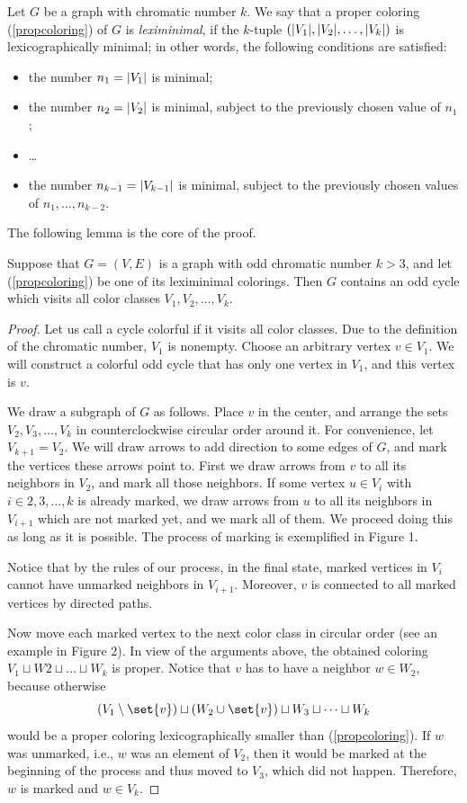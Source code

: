 \begin{problem}
Let $G$ be a graph with chromatic number $k$. We say that a proper coloring (\ref{propcoloring}) of $G$ is \textit{leximinimal}, if the $k$-tuple $(\lvert V_1\rvert, \lvert V_2\rvert, \dots , \lvert V_k\rvert)$ is lexicographically minimal; in other words, the following conditions are satisfied: 
\begin{itemize}
\item the number $n_1 = \lvert V_1\rvert$ is minimal; 
\item the number $n_2 = \lvert V_2\rvert$ is
minimal, subject to the previously chosen value of $n_1$; 
\item \dots  
\item the number $n_{k-1}  = \lvert V_{k-1}\rvert$ is minimal,
subject to the previously chosen values of $n_1, \dots , n_{k-2}$.
\end{itemize}
The following lemma is the core of the proof.
\begin{lemma}
\label{leximinlemma} 
Suppose that $G = (V, E)$ is a graph with odd chromatic number $k > 3$, and let (\ref{propcoloring}) be one of its leximinimal colorings. Then $G$ contains an odd cycle which visits all color classes
$V_1, V_2, \dots, V_k$.
\end{lemma}
\begin{proof}
Let us call a cycle colorful if it visits all color classes. Due to the definition of the chromatic number, $V_1$ is nonempty. Choose an arbitrary vertex $v \in V_1$. We will construct a colorful odd cycle that has only one vertex in $V_1$, and this vertex is $v$. 

We draw a subgraph of $G$ as follows. Place $v$ in the center, and arrange the sets $V_2, V_3, \dots , V_k$ in counterclockwise circular order around it. For convenience, let $V_{k+1} = V_2$. We will draw arrows to add direction to some edges of $G$, and mark the vertices these arrows point to. First we draw arrows from $v$ to all its neighbors in $V_2$, and mark all those neighbors. If some vertex $u \in V_i$ with $i \in {2, 3, \dots , k}$ is already marked, we draw arrows from $u$ to all its neighbors in $V_{i+1}$ which are not marked yet, and we mark all of them. We proceed doing this as long as it is possible. The process of marking is exemplified in Figure 1.

Notice that by the rules of our process, in the final state, marked vertices in $V_i$ cannot have unmarked neighbors in $V_{i+1}$. Moreover, $v$ is connected to all marked vertices by directed paths. 

Now move each marked vertex to the next color class in circular order (see an example in Figure 2). In view of the arguments above, the obtained coloring $V_1 \sqcup W2 \sqcup \dots \sqcup W_k$ is proper. Notice that $v$ has to have a neighbor $w \in W_2$, because otherwise
\begin{equation}
(V_1  \setminus \set{v}) \sqcup (W_2 \cup \set{v}) \sqcup W_3 \sqcup \dots \sqcup W_k
\end{equation}
would be a proper coloring lexicographically smaller than (\ref{propcoloring}). If $w$ was unmarked, i.e., $w$ was an element of $V_2$, then it would be marked at the beginning of the process and thus moved to $V_3$, which did not happen. Therefore, $w$ is marked and $w \in V_k$.


\end{proof}
\end{problem}
